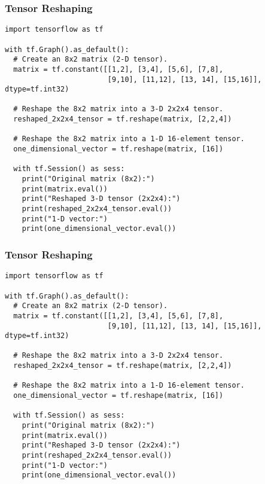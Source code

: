 \begin{frame}[fragile] \frametitle{Tensor Reshaping}
\begin{lstlisting}
import tensorflow as tf

with tf.Graph().as_default():
  # Create an 8x2 matrix (2-D tensor).
  matrix = tf.constant([[1,2], [3,4], [5,6], [7,8],
                        [9,10], [11,12], [13, 14], [15,16]], dtype=tf.int32)

  # Reshape the 8x2 matrix into a 3-D 2x2x4 tensor.
  reshaped_2x2x4_tensor = tf.reshape(matrix, [2,2,4])
  
  # Reshape the 8x2 matrix into a 1-D 16-element tensor.
  one_dimensional_vector = tf.reshape(matrix, [16])

  with tf.Session() as sess:
    print("Original matrix (8x2):")
    print(matrix.eval())
    print("Reshaped 3-D tensor (2x2x4):")
    print(reshaped_2x2x4_tensor.eval())
    print("1-D vector:")
    print(one_dimensional_vector.eval())
\end{lstlisting}

\end{frame}

\begin{frame}[fragile] \frametitle{Tensor Reshaping}
\begin{lstlisting}
import tensorflow as tf

with tf.Graph().as_default():
  # Create an 8x2 matrix (2-D tensor).
  matrix = tf.constant([[1,2], [3,4], [5,6], [7,8],
                        [9,10], [11,12], [13, 14], [15,16]], dtype=tf.int32)

  # Reshape the 8x2 matrix into a 3-D 2x2x4 tensor.
  reshaped_2x2x4_tensor = tf.reshape(matrix, [2,2,4])
  
  # Reshape the 8x2 matrix into a 1-D 16-element tensor.
  one_dimensional_vector = tf.reshape(matrix, [16])

  with tf.Session() as sess:
    print("Original matrix (8x2):")
    print(matrix.eval())
    print("Reshaped 3-D tensor (2x2x4):")
    print(reshaped_2x2x4_tensor.eval())
    print("1-D vector:")
    print(one_dimensional_vector.eval())
\end{lstlisting}

\end{frame}

